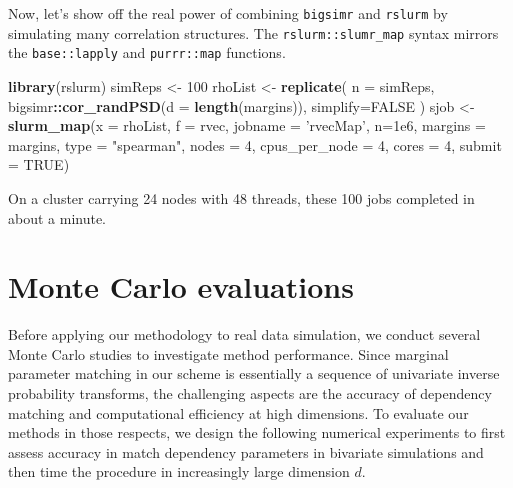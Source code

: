 \documentclass[]{article}
\newenvironment{Shaded}{\begin{snugshade}}{\end{snugshade}}
\newcommand{\DataTypeTok}[1]{\textcolor[rgb]{0.13,0.29,0.53}{#1}}
\newcommand{\DecValTok}[1]{\textcolor[rgb]{0.00,0.00,0.81}{#1}}
\newcommand{\FloatTok}[1]{\textcolor[rgb]{0.00,0.00,0.81}{#1}}
\newcommand{\KeywordTok}[1]{\textcolor[rgb]{0.13,0.29,0.53}{\textbf{#1}}}
\newcommand{\NormalTok}[1]{#1}
\newcommand{\OperatorTok}[1]{\textcolor[rgb]{0.81,0.36,0.00}{\textbf{#1}}}
\newcommand{\OtherTok}[1]{\textcolor[rgb]{0.56,0.35,0.01}{#1}}
\newcommand{\StringTok}[1]{\textcolor[rgb]{0.31,0.60,0.02}{#1}}
\begin{document}
Now, let's show off the real power of combining \texttt{bigsimr} and \texttt{rslurm} by simulating many correlation structures.
The \texttt{rslurm::slumr\_map} syntax mirrors the \texttt{base::lapply} and \texttt{purrr::map} functions.

\begin{Shaded}
\begin{Highlighting}[]
\KeywordTok{library}\NormalTok{(rslurm)}
\NormalTok{simReps <-}\StringTok{ }\DecValTok{100}
\NormalTok{rhoList <-}\StringTok{ }\KeywordTok{replicate}\NormalTok{( }\DataTypeTok{n =}\NormalTok{ simReps, bigsimr}\OperatorTok{::}\KeywordTok{cor_randPSD}\NormalTok{(}\DataTypeTok{d =} \KeywordTok{length}\NormalTok{(margins)),}
                     \DataTypeTok{simplify=}\OtherTok{FALSE}\NormalTok{ )}
\NormalTok{sjob <-}\StringTok{ }\KeywordTok{slurm_map}\NormalTok{(}\DataTypeTok{x =}\NormalTok{ rhoList,}
                  \DataTypeTok{f =}\NormalTok{ rvec,}
                  \DataTypeTok{jobname =} \StringTok{'rvecMap'}\NormalTok{,}
                  \DataTypeTok{n=}\FloatTok{1e6}\NormalTok{,}
                  \DataTypeTok{margins =}\NormalTok{ margins,}
                  \DataTypeTok{type =} \StringTok{"spearman"}\NormalTok{,}
                  \DataTypeTok{nodes =} \DecValTok{4}\NormalTok{,}
                  \DataTypeTok{cpus_per_node =} \DecValTok{4}\NormalTok{,}
                  \DataTypeTok{cores =} \DecValTok{4}\NormalTok{,}
                  \DataTypeTok{submit =} \OtherTok{TRUE}\NormalTok{)}
\end{Highlighting}
\end{Shaded}

On a cluster carrying 24 nodes with 48 threads, these 100 jobs completed in about a minute.

\hypertarget{simulations}{%
\section{Monte Carlo evaluations}\label{simulations}}

Before applying our methodology to real data simulation, we conduct several Monte Carlo studies to investigate method performance.
Since marginal parameter matching in our scheme is essentially a sequence of univariate inverse probability transforms, the challenging aspects are the accuracy of dependency matching and computational efficiency at high dimensions.
To evaluate our methods in those respects, we design the following numerical experiments to first assess accuracy in match dependency parameters in bivariate simulations and then time the procedure in increasingly large dimension \(d\).
\end{document}
